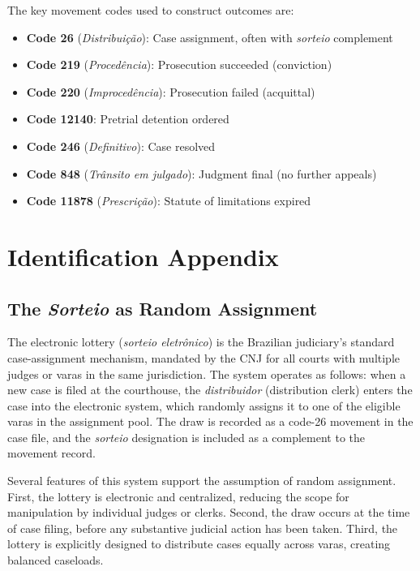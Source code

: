 \documentclass[12pt]{article}
\begin{document}
The key movement codes used to construct outcomes are:
\begin{itemize}
\item \textbf{Code 26} (\textit{Distribui\c{c}\~ao}): Case assignment, often with \textit{sorteio} complement
\item \textbf{Code 219} (\textit{Proced\^encia}): Prosecution succeeded (conviction)
\item \textbf{Code 220} (\textit{Improced\^encia}): Prosecution failed (acquittal)
\item \textbf{Code 12140}: Pretrial detention ordered
\item \textbf{Code 246} (\textit{Definitivo}): Case resolved
\item \textbf{Code 848} (\textit{Tr\^ansito em julgado}): Judgment final (no further appeals)
\item \textbf{Code 11878} (\textit{Prescri\c{c}\~ao}): Statute of limitations expired
\end{itemize}

\section{Identification Appendix}
\label{app:identification}

\subsection{The \textit{Sorteio} as Random Assignment}

The electronic lottery (\textit{sorteio eletr\^onico}) is the Brazilian judiciary's standard case-assignment mechanism, mandated by the CNJ for all courts with multiple judges or varas in the same jurisdiction. The system operates as follows: when a new case is filed at the courthouse, the \textit{distribuidor} (distribution clerk) enters the case into the electronic system, which randomly assigns it to one of the eligible varas in the assignment pool. The draw is recorded as a code-26 movement in the case file, and the \textit{sorteio} designation is included as a complement to the movement record.

Several features of this system support the assumption of random assignment. First, the lottery is electronic and centralized, reducing the scope for manipulation by individual judges or clerks. Second, the draw occurs at the time of case filing, before any substantive judicial action has been taken. Third, the lottery is explicitly designed to distribute cases equally across varas, creating balanced caseloads.
\end{document}
